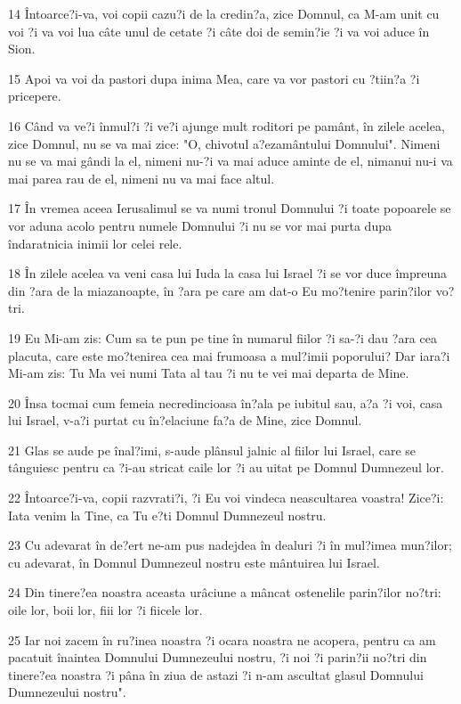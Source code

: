 \par 14 Întoarce?i-va, voi copii cazu?i de la credin?a, zice Domnul, ca M-am unit cu voi ?i va voi lua câte unul de cetate ?i câte doi de semin?ie ?i va voi aduce în Sion.
\par 15 Apoi va voi da pastori dupa inima Mea, care va vor pastori cu ?tiin?a ?i pricepere.
\par 16 Când va ve?i înmul?i ?i ve?i ajunge mult roditori pe pamânt, în zilele acelea, zice Domnul, nu se va mai zice: "O, chivotul a?ezamântului Domnului". Nimeni nu se va mai gândi la el, nimeni nu-?i va mai aduce aminte de el, nimanui nu-i va mai parea rau de el, nimeni nu va mai face altul.
\par 17 În vremea aceea Ierusalimul se va numi tronul Domnului ?i toate popoarele se vor aduna acolo pentru numele Domnului ?i nu se vor mai purta dupa îndaratnicia inimii lor celei rele.
\par 18 În zilele acelea va veni casa lui Iuda la casa lui Israel ?i se vor duce împreuna din ?ara de la miazanoapte, în ?ara pe care am dat-o Eu mo?tenire parin?ilor vo?tri.
\par 19 Eu Mi-am zis: Cum sa te pun pe tine în numarul fiilor ?i sa-?i dau ?ara cea placuta, care este mo?tenirea cea mai frumoasa a mul?imii poporului? Dar iara?i Mi-am zis: Tu Ma vei numi Tata al tau ?i nu te vei mai departa de Mine.
\par 20 Însa tocmai cum femeia necredincioasa în?ala pe iubitul sau, a?a ?i voi, casa lui Israel, v-a?i purtat cu în?elaciune fa?a de Mine, zice Domnul.
\par 21 Glas se aude pe înal?imi, s-aude plânsul jalnic al fiilor lui Israel, care se tânguiesc pentru ca ?i-au stricat caile lor ?i au uitat pe Domnul Dumnezeul lor.
\par 22 Întoarce?i-va, copii razvrati?i, ?i Eu voi vindeca neascultarea voastra! Zice?i: Iata venim la Tine, ca Tu e?ti Domnul Dumnezeul nostru.
\par 23 Cu adevarat în de?ert ne-am pus nadejdea în dealuri ?i în mul?imea mun?ilor; cu adevarat, în Domnul Dumnezeul nostru este mântuirea lui Israel.
\par 24 Din tinere?ea noastra aceasta urâciune a mâncat ostenelile parin?ilor no?tri: oile lor, boii lor, fiii lor ?i fiicele lor.
\par 25 Iar noi zacem în ru?inea noastra ?i ocara noastra ne acopera, pentru ca am pacatuit înaintea Domnului Dumnezeului nostru, ?i noi ?i parin?ii no?tri din tinere?ea noastra ?i pâna în ziua de astazi ?i n-am ascultat glasul Domnului Dumnezeului nostru".

